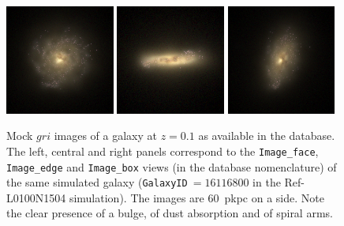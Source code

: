 \begin{figure}
\centering
\includegraphics[width=0.32\textwidth]{figures/galface_16116800.png}
\includegraphics[width=0.32\textwidth]{figures/galedge_16116800.png}
\includegraphics[width=0.32\textwidth]{figures/galrand_16116800.png}
\caption{Mock $gri$ images of a galaxy at $z=0.1$ as available in the database. The left,
  central and right panels correspond to the {\tt Image\_face}, {\tt
    Image\_edge} and {\tt Image\_box} views (in the database nomenclature) of
  the same simulated galaxy ({\tt GalaxyID}$~=16116800$ in the Ref-L0100N1504
  simulation). The images are 60~pkpc on a side. Note the clear presence of a
  bulge, of dust absorption and of spiral arms.}
\label{fig:mockImage}
\end{figure}

